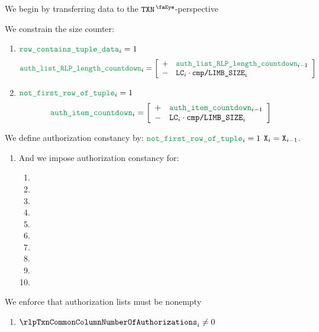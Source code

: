 \begin{center}
\end{center}
We begin by transferring data to the $\isTxn$-perspective

We constrain the size counter:
\begin{enumerate}
	\item \If $\locAuthorizationData        _{i} = 1$ \Then
		\[
			\locAuthorizationLengthCountdown _{i} =
			\left[ \begin{array}{cl}
				+ & \locAuthorizationLengthCountdown _{i - 1}            \\
				- & \lc _{i} \cdot \rlpTxnComputationColumnLimbSize _{i} \\
			\end{array} \right]
		\]
	\item \If $\locAuthorizationNotFirstRow _{i} = 1$ \Then
		\[
			\locAuthorizationItemCountdown   _{i} =
			\left[ \begin{array}{cl}
				+ & \locAuthorizationItemCountdown   _{i - 1}            \\
				- & \lc _{i} \cdot \rlpTxnComputationColumnLimbSize _{i} \\
			\end{array} \right]
		\]
\end{enumerate}
We define authorization constancy by:
\If $\locAuthorizationNotFirstRow _{i} = 1$ \Then $\texttt{X} _{i} = \texttt{X} _{i - 1} $.
\begin{enumerate}[resume]
	\item And we impose authorization constancy for:
		\begin{enumerate}
			\item \locAuthorizationChainIdHi {}
			\item \locAuthorizationChainIdLo {}
			\item \locAuthorizationAddressHi {}
			\item \locAuthorizationAddressLo {}
			\item \locAuthorizationNonce     {}
			\item \locAuthorizationY         {}
			\item \locAuthorizationRHi       {}
			\item \locAuthorizationRLo       {}
			\item \locAuthorizationSHi       {}
			\item \locAuthorizationSLo       {}
		\end{enumerate}
\end{enumerate}
We enforce that authorization lists must be nonempty
\begin{enumerate}[resume]
	\item\label{rlp txn: phase constraints: authorization list: constraints: authorization lists must be nonempty}
		$\rlpTxnCommonColumnNumberOfAuthorizations _{i} \neq 0$ \sanityCheck
\end{enumerate}
